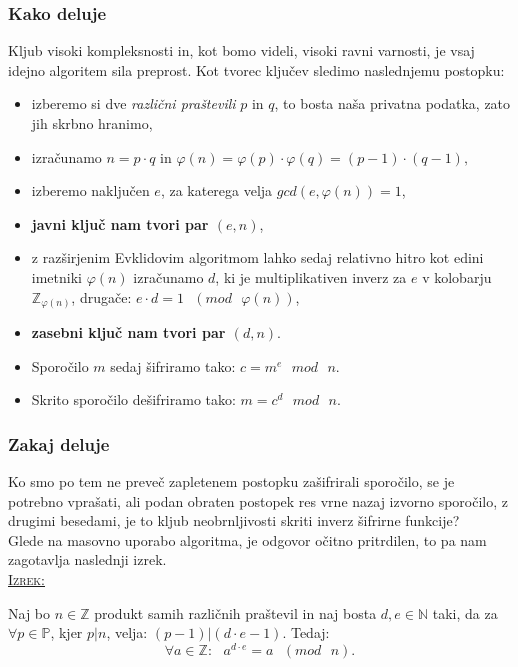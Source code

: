 \documentclass[a4paper, 12pt]{article} %
\newenvironment{matematika}[1]{
\textcolor{bostonuniversityred}{\underline{\textsc{#1:}}}
}{
}
\begin{document}
\subsubsection{Kako deluje}
Kljub visoki kompleksnosti in, kot bomo videli, visoki ravni varnosti, je vsaj idejno algoritem sila preprost. Kot tvorec ključev sledimo naslednjemu postopku:
\begin{itemize}[label=]
\item izberemo si dve \emph{različni praštevili} $p$ in $q$, to bosta naša privatna podatka, zato jih skrbno hranimo,
\item izračunamo $n=p \cdot q$ in $\varphi (n) = \varphi (p) \cdot \varphi (q) = (p-1) \cdot (q-1),$
\item izberemo naključen $e$, za katerega velja $gcd(e, \varphi (n)) = 1$,
\item \textbf{javni ključ nam tvori par $(e, n)$},
\item z razširjenim Evklidovim algoritmom lahko sedaj relativno hitro kot edini imetniki $\varphi (n)$ izračunamo $d$, ki je multiplikativen inverz za $e$ v kolobarju $\mathbb{Z}_{\varphi (n)}$, drugače: $e \cdot d = 1 \text{ } (mod \text{ } \varphi (n))$,
\item \textbf{zasebni ključ nam tvori par $(d, n)$}.
\item Sporočilo $m$ sedaj šifriramo tako: $c = m^e \text{ } mod \text{ } n$.
\item Skrito sporočilo dešifriramo tako: $m = c^d \text{ } mod \text{ } n$.
\end{itemize}

\subsubsection{Zakaj deluje}

Ko smo po tem ne preveč zapletenem postopku zašifrirali sporočilo, se je potrebno vprašati, ali podan obraten postopek res vrne nazaj izvorno sporočilo, z drugimi besedami, je to kljub neobrnljivosti skriti inverz šifrirne funkcije? \\
Glede na masovno uporabo algoritma, je odgovor očitno pritrdilen, to pa nam zagotavlja naslednji izrek. \\

\begin{matematika}{Izrek}
Naj bo $n \in \mathbb{Z}$ produkt samih različnih praštevil in naj bosta $d, e \in \mathbb{N}$ taki, da za $\forall p \in \mathbb{P}$, kjer $p|n$, velja: $(p-1)|(d \cdot e - 1)$. Tedaj:
\[
\forall a \in \mathbb{Z}: \text{ } a^{d \cdot e} = a \text{ } (mod \text{ } n).
\]
\end{matematika}
\end{document}
